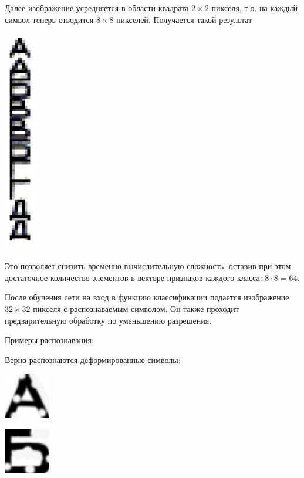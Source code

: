 Далее изображение усредняется в области квадрата $2\times 2$ пикселя, т.о. на каждый символ теперь отводится $8\times 8$ пикселей. Получается такой результат
\begin{center}
	\includegraphics[width=1.5cm]{image_for_report/teach_5_2.jpg}
\end{center}

Это позволяет снизить временно-вычислительную сложность, оставив при этом достаточное количество элементов в векторе признаков каждого класса: $8 \cdot 8 = 64$.

После обучения сети на вход в функцию классификации подается изображение $32\times 32$ пикселя с распознаваемым символом. Он также проходит предварительную обработку по уменьшению разрешения.

Примеры распознавания:

Верно распознаются деформированные символы:
\begin{center}
	\includegraphics[width=2cm]{image_for_report/sample_a.jpg}
\end{center}
\begin{center}
	\includegraphics[width=2cm]{image_for_report/sample_b_2.jpg}
\end{center}

